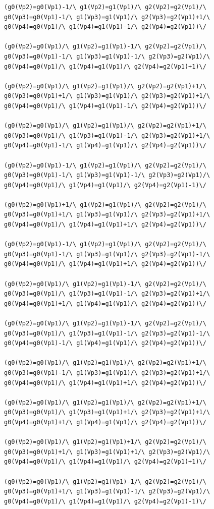 \begin{appendices}
\begin{lstlisting}
(g0(Vp2)=g0(Vp1)-1/\ g1(Vp2)=g1(Vp1)/\ g2(Vp2)=g2(Vp1)/\ g0(Vp3)=g0(Vp1)-1/\ g1(Vp3)=g1(Vp1)/\ g2(Vp3)=g2(Vp1)+1/\ g0(Vp4)=g0(Vp1)/\ g1(Vp4)=g1(Vp1)-1/\ g2(Vp4)=g2(Vp1))\/ 

(g0(Vp2)=g0(Vp1)/\ g1(Vp2)=g1(Vp1)-1/\ g2(Vp2)=g2(Vp1)/\ g0(Vp3)=g0(Vp1)-1/\ g1(Vp3)=g1(Vp1)-1/\ g2(Vp3)=g2(Vp1)/\ g0(Vp4)=g0(Vp1)/\ g1(Vp4)=g1(Vp1)/\ g2(Vp4)=g2(Vp1)+1)\/ 

(g0(Vp2)=g0(Vp1)/\ g1(Vp2)=g1(Vp1)/\ g2(Vp2)=g2(Vp1)+1/\ g0(Vp3)=g0(Vp1)+1/\ g1(Vp3)=g1(Vp1)/\ g2(Vp3)=g2(Vp1)+1/\ g0(Vp4)=g0(Vp1)/\ g1(Vp4)=g1(Vp1)-1/\ g2(Vp4)=g2(Vp1))\/ 

(g0(Vp2)=g0(Vp1)/\ g1(Vp2)=g1(Vp1)/\ g2(Vp2)=g2(Vp1)+1/\ g0(Vp3)=g0(Vp1)/\ g1(Vp3)=g1(Vp1)-1/\ g2(Vp3)=g2(Vp1)+1/\ g0(Vp4)=g0(Vp1)-1/\ g1(Vp4)=g1(Vp1)/\ g2(Vp4)=g2(Vp1))\/ 

(g0(Vp2)=g0(Vp1)-1/\ g1(Vp2)=g1(Vp1)/\ g2(Vp2)=g2(Vp1)/\ g0(Vp3)=g0(Vp1)-1/\ g1(Vp3)=g1(Vp1)-1/\ g2(Vp3)=g2(Vp1)/\ g0(Vp4)=g0(Vp1)/\ g1(Vp4)=g1(Vp1)/\ g2(Vp4)=g2(Vp1)-1)\/ 

(g0(Vp2)=g0(Vp1)+1/\ g1(Vp2)=g1(Vp1)/\ g2(Vp2)=g2(Vp1)/\ g0(Vp3)=g0(Vp1)+1/\ g1(Vp3)=g1(Vp1)/\ g2(Vp3)=g2(Vp1)+1/\ g0(Vp4)=g0(Vp1)/\ g1(Vp4)=g1(Vp1)+1/\ g2(Vp4)=g2(Vp1))\/ 

(g0(Vp2)=g0(Vp1)-1/\ g1(Vp2)=g1(Vp1)/\ g2(Vp2)=g2(Vp1)/\ g0(Vp3)=g0(Vp1)-1/\ g1(Vp3)=g1(Vp1)/\ g2(Vp3)=g2(Vp1)-1/\ g0(Vp4)=g0(Vp1)/\ g1(Vp4)=g1(Vp1)+1/\ g2(Vp4)=g2(Vp1))\/ 

(g0(Vp2)=g0(Vp1)/\ g1(Vp2)=g1(Vp1)-1/\ g2(Vp2)=g2(Vp1)/\ g0(Vp3)=g0(Vp1)/\ g1(Vp3)=g1(Vp1)-1/\ g2(Vp3)=g2(Vp1)+1/\ g0(Vp4)=g0(Vp1)+1/\ g1(Vp4)=g1(Vp1)/\ g2(Vp4)=g2(Vp1))\/ 

(g0(Vp2)=g0(Vp1)/\ g1(Vp2)=g1(Vp1)-1/\ g2(Vp2)=g2(Vp1)/\ g0(Vp3)=g0(Vp1)/\ g1(Vp3)=g1(Vp1)-1/\ g2(Vp3)=g2(Vp1)-1/\ g0(Vp4)=g0(Vp1)-1/\ g1(Vp4)=g1(Vp1)/\ g2(Vp4)=g2(Vp1))\/ 

(g0(Vp2)=g0(Vp1)/\ g1(Vp2)=g1(Vp1)/\ g2(Vp2)=g2(Vp1)+1/\ g0(Vp3)=g0(Vp1)-1/\ g1(Vp3)=g1(Vp1)/\ g2(Vp3)=g2(Vp1)+1/\ g0(Vp4)=g0(Vp1)/\ g1(Vp4)=g1(Vp1)+1/\ g2(Vp4)=g2(Vp1))\/ 

(g0(Vp2)=g0(Vp1)/\ g1(Vp2)=g1(Vp1)/\ g2(Vp2)=g2(Vp1)+1/\ g0(Vp3)=g0(Vp1)/\ g1(Vp3)=g1(Vp1)+1/\ g2(Vp3)=g2(Vp1)+1/\ g0(Vp4)=g0(Vp1)+1/\ g1(Vp4)=g1(Vp1)/\ g2(Vp4)=g2(Vp1))\/ 

(g0(Vp2)=g0(Vp1)/\ g1(Vp2)=g1(Vp1)+1/\ g2(Vp2)=g2(Vp1)/\ g0(Vp3)=g0(Vp1)+1/\ g1(Vp3)=g1(Vp1)+1/\ g2(Vp3)=g2(Vp1)/\ g0(Vp4)=g0(Vp1)/\ g1(Vp4)=g1(Vp1)/\ g2(Vp4)=g2(Vp1)+1)\/ 

(g0(Vp2)=g0(Vp1)/\ g1(Vp2)=g1(Vp1)-1/\ g2(Vp2)=g2(Vp1)/\ g0(Vp3)=g0(Vp1)+1/\ g1(Vp3)=g1(Vp1)-1/\ g2(Vp3)=g2(Vp1)/\ g0(Vp4)=g0(Vp1)/\ g1(Vp4)=g1(Vp1)/\ g2(Vp4)=g2(Vp1)-1)\/ 


\end{lstlisting}
\end{appendices}
